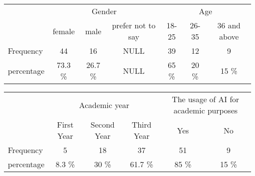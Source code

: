 \begin{table}[H]
	\begin{tabular}{l|ccc|ccc|}
		\cline{2-7}
		\multirow{2}{*}{}                & \multicolumn{3}{c|}{Gender}  & \multicolumn{3}{c|}{Age}                                                                                                                                            \\ \cline{2-7}
		                                 & \multicolumn{1}{c|}{female}  & \multicolumn{1}{c|}{male}    & \multicolumn{1}{c|}{prefer not to say} & \multicolumn{1}{c|}{18-25} & \multicolumn{1}{c|}{26-35} & \multicolumn{1}{c|}{36 and above} \\ \hline
		\multicolumn{1}{|l|}{Frequency}  & \multicolumn{1}{c|}{44}      & \multicolumn{1}{c|}{16}      & \multicolumn{1}{c|}{NULL}              & \multicolumn{1}{c|}{39}    & \multicolumn{1}{c|}{12}    & \multicolumn{1}{c|}{9}            \\ \hline
		\multicolumn{1}{|l|}{percentage} & \multicolumn{1}{c|}{73.3 \%} & \multicolumn{1}{c|}{26.7 \%} & \multicolumn{1}{c|}{NULL}              & \multicolumn{1}{c|}{65 \%} & \multicolumn{1}{c|}{20 \%} & \multicolumn{1}{c|}{15 \%}        \\ \hline
	\end{tabular}
\end{table}
\begin{table}[H]
	\begin{tabular}{l|ccc|cc|}
		\cline{2-6}
		\multirow{2}{*}{}                & \multicolumn{3}{c|}{Academic year} & \multicolumn{2}{c|}{The usage of AI for academic purposes}                                                                                             \\ \cline{2-6}
		                                 & \multicolumn{1}{c|}{First Year}    & \multicolumn{1}{c|}{Second Year}                           & \multicolumn{1}{c|}{Third Year} & \multicolumn{1}{c|}{Yes}   & \multicolumn{1}{c|}{No}    \\ \hline
		\multicolumn{1}{|l|}{Frequency}  & \multicolumn{1}{c|}{5}             & \multicolumn{1}{c|}{18}                                    & \multicolumn{1}{c|}{37}         & \multicolumn{1}{c|}{51}    & \multicolumn{1}{c|}{9}     \\ \hline
		\multicolumn{1}{|l|}{percentage} & \multicolumn{1}{c|}{8.3 \%}        & \multicolumn{1}{c|}{30 \%}                                 & \multicolumn{1}{c|}{61.7 \%}    & \multicolumn{1}{c|}{85 \%} & \multicolumn{1}{c|}{15 \%} \\ \hline
	\end{tabular}
\end{table}

